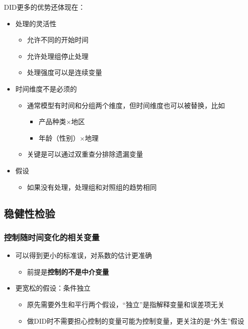 \documentclass[11pt,a4paper]{ctexart}
\begin{document}
DID更多的优势还体现在：

\begin{itemize}
\item
  处理的灵活性

  \begin{itemize}
  \item
    允许不同的开始时间
  \item
    允许处理组停止处理
  \item
    处理强度可以是连续变量
  \end{itemize}
\item
  时间维度不是必须的

  \begin{itemize}
  \item
    通常模型有时间和分组两个维度，但时间维度也可以被替换，比如

    \begin{itemize}
    \item
      产品种类\(\times\)地区
    \item
      年龄（性别）\(\times \)地理
    \end{itemize}
  \item
    关键是可以通过双重查分排除遗漏变量
  \end{itemize}
\item
  假设

  \begin{itemize}
  \item
    如果没有处理，处理组和对照组的趋势相同
  \end{itemize}
\end{itemize}

\subsection{稳健性检验}

\subsubsection{控制随时间变化的相关变量}

\begin{itemize}
\item
  可以得到更小的标准误，对系数的估计更准确

  \begin{itemize}
  \item
    前提是\textbf{控制的不是中介变量}
  \end{itemize}
\item
  更宽松的假设：条件独立

  \begin{itemize}
  \item
    原先需要外生和平行两个假设，``独立''是指解释变量和误差项无关
  \item
    做DID时不需要担心控制的变量可能为控制变量，更关注的是``外生''假设
  \end{itemize}
\end{itemize}
\end{document}
